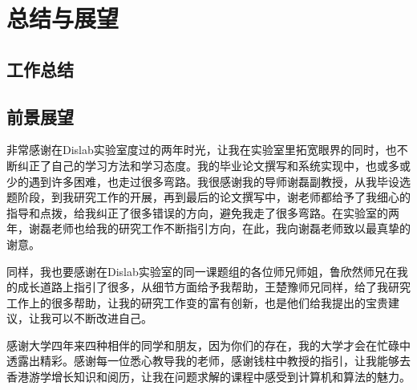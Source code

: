 \documentclass[winfonts]{njuthesis}
\begin{document}
\chapter{总结与展望}
	\section{工作总结}
	\section{前景展望}

	\begin{acknowledgement}
		
		非常感谢在Dislab实验室度过的两年时光，让我在实验室里拓宽眼界的同时，也不断纠正了自己的学习方法和学习态度。我的毕业论文撰写和系统实现中，也或多或少的遇到许多困难，也走过很多弯路。我很感谢我的导师谢磊副教授，从我毕设选题阶段，到我研究工作的开展，再到最后的论文撰写中，谢老师都给予了我细心的指导和点拨，给我纠正了很多错误的方向，避免我走了很多弯路。在实验室的两年，谢磊老师也给我的研究工作不断指引方向，在此，我向谢磊老师致以最真挚的谢意。
		
		同样，我也要感谢在Dislab实验室的同一课题组的各位师兄师姐，鲁欣然师兄在我的成长道路上指引了很多，从细节方面给予我帮助，王楚豫师兄同样，给了我研究工作上的很多帮助，让我的研究工作变的富有创新，也是他们给我提出的宝贵建议，让我可以不断改进自己。
		
		感谢大学四年来四种相伴的同学和朋友，因为你们的存在，我的大学才会在忙碌中透露出精彩。感谢每一位悉心教导我的老师，感谢钱柱中教授的指引，让我能够去香港游学增长知识和阅历，让我在问题求解的课程中感受到计算机和算法的魅力。
		
	\end{acknowledgement}
\end{document}

